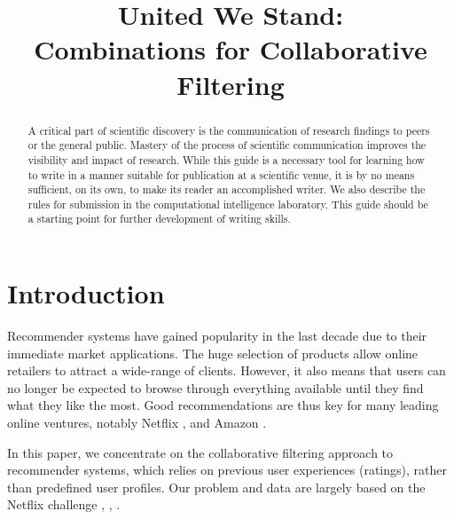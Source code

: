 \documentclass[10pt,conference,compsocconf]{IEEEtran}
\begin{document}
	\title{United We Stand:\\ Combinations for Collaborative Filtering}
	
	\author{
		\and
		\and
	}
	
	\maketitle
	
	\begin{abstract}
		A critical part of scientific discovery is the
		communication of research findings to peers or the general public.
		Mastery of the process of scientific communication improves the
		visibility and impact of research. While this guide is a necessary
		tool for learning how to write in a manner suitable for publication
		at a scientific venue, it is by no means sufficient, on its own, to
		make its reader an accomplished writer. We also describe the rules
		for submission in the computational intelligence laboratory.
		This guide should be a
		starting point for further development of writing skills.
	\end{abstract}
	
	\section{Introduction}
	
	Recommender systems have gained popularity in the last decade due to their immediate market applications. The huge selection of products allow online retailers to attract a wide-range of clients. However, it also means that users can no longer be expected to browse through everything available until they find what they like the most. Good recommendations are thus key for many leading online ventures, notably Netflix \cite{amatriain2012netflix}, and Amazon \cite{linden2003amazon}.
	
	In this paper, we concentrate on the collaborative filtering approach to recommender systems, which relies on previous user experiences (ratings), rather than predefined user profiles. Our problem and data are largely based on the Netflix challenge \cite{SMH07}, \cite{Koren09matrixfactorization}, \cite{funk2011netflix}.
	
\end{document}
